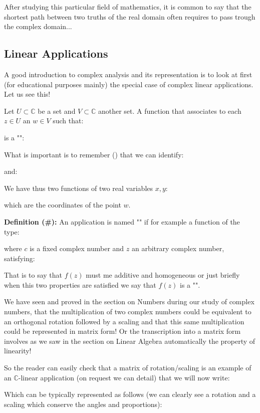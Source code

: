 After studying this particular field of mathematics, it is common to say that the shortest path between two truths of the real domain often requires to pass trough the complex domain...

\subsection{Linear Applications}

A good introduction to complex analysis and its representation is to look at first (for educational purposes mainly) the special case of complex linear applications. Let us see this!

Let $U \subset \mathbb{C}$ be a set and $V \subset \mathbb{C}$ another set. A function that associates to each $z \in U$ an $w \in V$ such that:
	
is a "":
	
What is important is to remember () that we can identify:
	
and:
	
We have thus two functions of two real variables $x, y$:
	
which are the coordinates of the point $w$.

\textbf{Definition (\#\mydef):} An application is named "" if for example a function of the type:
	
where $c$ is a fixed complex number and $z$ an arbitrary complex number, satisfying:
	

That is to say that $f(z)$ must me additive and homogeneous or just briefly when this two properties are satisfied we say that $f(z)$ is a "".

We have seen and proved in the section on Numbers during our study of complex numbers, that the multiplication of two complex numbers could be equivalent to an orthogonal rotation followed by a scaling and that this same multiplication could be represented in matrix form! Or the transcription into a matrix form involves as we saw in the section on Linear Algebra automatically  the property of linearity!

So the reader can easily check that a matrix of rotation/scaling is an example of an $\mathbb{C}$-linear application (on request we can detail) that we will now write:
	
Which can be typically represented as follows (we can clearly see a rotation and a scaling which conserve the angles and proportions):

